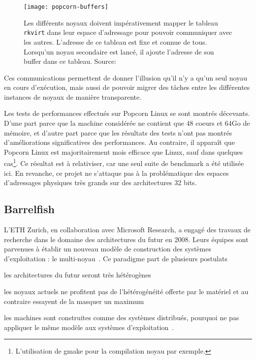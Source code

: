       \begin{figure}[h]
        \centering
        \texttt{[image: popcorn-buffers]}
        \caption{Les différents noyaux doivent impérativement mapper le tableau
          \texttt{rkvirt} dans leur espace d'adressage pour pouvoir communiquer
          avec les autres. L'adresse de ce tableau est fixe et connue de tous.
          Lorsqu'un noyau secondaire est lancé, il ajoute l'adresse de son
          buffer dans ce tableau. Source:~\citeauthor{barbalacepopcorn}}
        \label{fig:popcorn-buf}
      \end{figure}

      Ces communications permettent de donner l’illusion qu’il n’y a qu’un seul
      noyau en cours d’exécution, mais aussi de pouvoir migrer des tâches entre
      les différentes instances de noyaux de manière transparente.\newline

      Les tests de performances effectués sur Popcorn Linux se sont montrés
      décevants. D'une part parce que la machine considérée ne contient que 48
      coeurs et 64Go de mémoire, et d'autre part parce que les résultats des
      tests n'ont pas montrés d'améliorations significatives des
      performances. Au contraire, il apparaît que Popcorn Linux est
      majoritairement mois efficace que Linux, sauf dans quelques
      cas\footnote{L'utilisation de gmake pour la compilation noyau par
        exemple.}. Ce résultat est à relativiser, car une seul suite de
      benchmark a été utilisée ici. En revanche, ce projet ne s'attaque pas à la
      problématique des espaces d'adressages physiques très grands sur des
      architectures 32 bits.


    \subsection{Barrelfish}
      
      L’ETH Zurich, en collaboration avec Microsoft Research, a engagé des
      travaux de recherche dans le domaine des architectures du futur en
      2008. Leurs équipes sont parvenues à établir un nouveau modèle de
      construction des systèmes d’exploitation : le
      multi-noyau~\citep{baumann2009multikernel}. Ce paradigme part de plusieurs
      postulats\benumline \item les architectures du futur seront très
      hétérogènes \item les noyaux actuels ne profitent pas de l’hétérogénéité
      offerte par le matériel et au contraire essayent de la masquer un maximum
      \item les machines sont construites comme des systèmes distribués,
        pourquoi ne pas appliquer le même modèle aux systèmes
        d’exploitation~\citep{baumann2009your}\eenumline.\\

